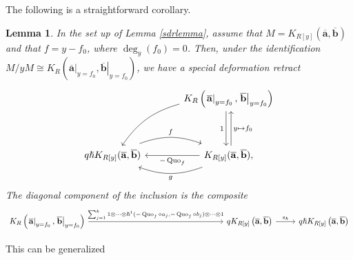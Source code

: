 \documentclass{article}
\DeclareMathOperator{\Quo}{Quo}
\theoremstyle{plain} %
\newtheorem{lemma}[theorem]{Lemma}
\theoremstyle{definition} %
\theoremstyle{remark} %
\begin{document}
The following is a straightforward corollary.

\begin{lemma}\label{lemma:sdrkoszullinear}
    In the set up of Lemma \ref{sdrlemma}, assume that $M=K_{R[y]}(\mathbf{\overline a},\mathbf{\overline b})$
    and that 
    $f=y-f_0$, where $\deg_y(f_0)=0$. Then, under the identification 
    $M/yM\cong K_{R}\left(\left.\mathbf{\overline a}\right|_{y=f_0},\left.\mathbf{\overline b}\right|_{y=f_0}\right)$,
    we have a special deformation retract
     $$
\begin{tikzcd}[column sep=large]
    &
    K_{R}\left(\left.\mathbf{\overline a}\right|_{y=f_0},\left.\mathbf{\overline b}\right|_{y=f_0}\right)
    \ar[dd, shift right=0.6ex, "1", swap]
    \ar[dd, leftarrow, shift left=0.6ex, "y\mapsto f_0"]
    \arrow[ddl, "{}", bend right=20, swap]
    \\\\
    q\hslash K_{R[y]}(\mathbf{\overline a},\mathbf{\overline b})
    \arrow[r, "f", shift left=0.5ex, bend left=20]
    & 
    K_{R[y]}(\mathbf{\overline a},\mathbf{\overline b})
    \ar[l, "-\Quo_f"]
    \arrow[l, "g", shift left=0.5ex, bend left=20], 
\end{tikzcd}
$$
The diagonal component of the inclusion is the composite
$$
\begin{tikzcd}
    K_{R}\left(\left.\mathbf{\overline a}\right|_{y=f_0},\left.\mathbf{\overline b}\right|_{y=f_0}\right) \arrow[r, "{\sum_{j=1}^k1\otimes\cdots \otimes\hslash^1(-\Quo_f\circ a_j,-\Quo_f\circ b_j)\otimes\cdots\otimes 1}"] 
    &[5cm]
    qK_{R[y]}\left(\mathbf{\overline a},\mathbf{\overline b}\right) 
    \arrow[r,"s_\hslash"] 
    & 
    q\hslash K_{R[y]}\left(\mathbf{\overline a},\mathbf{\overline b}\right)
\end{tikzcd}
$$
\end{lemma}

This can be generalized 
\end{document}
